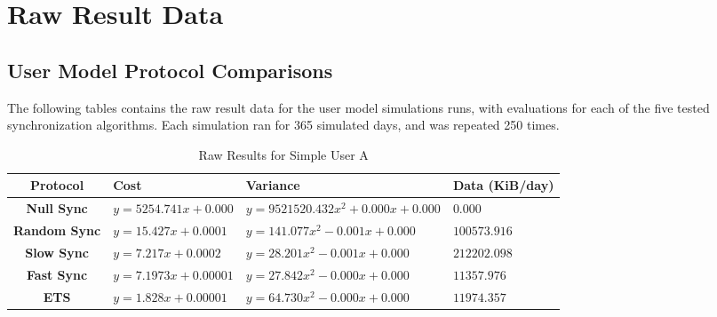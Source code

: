 \chapter{Raw Result Data}\label{rawresults}

\section{User Model Protocol Comparisons}

The following tables contains the raw result data for the user model simulations runs, with evaluations for each of the five tested synchronization algorithms.  Each simulation ran for 365 simulated days, and was repeated 250 times.


\begin{table}[htdp]
\begin{center}
\begin{tabular}{|c|l|l|l|}
\hline
\tiny\textbf{Protocol} &  \tiny\textbf{Cost} & \tiny\textbf{Variance} & \tiny\textbf{Data (KiB/day)} \\
\hline
\tiny\textbf{Null Sync} & \tiny$y=5254.741x+0.000$ & \tiny$y=9521520.432x^2+0.000x+0.000$ & \tiny$0.000$ \\
\hline
\tiny\textbf{Random Sync} & \tiny$y=15.427x+0.0001$ & \tiny$y=141.077x^2-0.001x+0.000$ & \tiny$100573.916$ \\
\hline
\tiny\textbf{Slow Sync} & \tiny$y=7.217x+0.0002$ & \tiny$y=28.201x^2-0.001x+0.000$ & \tiny$212202.098$ \\
\hline
\tiny\textbf{Fast Sync} & \tiny$y=7.1973x+0.00001$ & \tiny$y=27.842x^2-0.000x+0.000$ & \tiny$11357.976$ \\
\hline
\tiny\textbf{ETS} & \tiny$y=1.828x+0.00001$ & \tiny$y=64.730x^2-0.000x+0.000$ & \tiny$11974.357$ \\
\hline
\end{tabular}
\end{center}
\caption{Raw Results for Simple User A}
\label{simple_a:rawresults}
\end{table}


